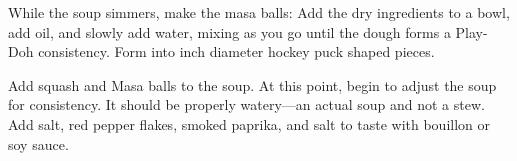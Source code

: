 \documentclass[12 pt, twoside]{amsart}
\begin{document}
{\begin{directions}
\item While the soup simmers, make the masa balls: Add the dry ingredients to a bowl, add oil, and slowly add water, mixing as you go until the dough forms a Play-Doh consistency. Form into inch diameter hockey puck shaped pieces. 
\item Add squash and Masa balls to the soup. At this point, begin to adjust the soup for consistency. It should be properly watery---an actual soup and not a stew. Add salt, red pepper flakes, smoked paprika, and salt to taste with bouillon or soy sauce.
\end{directions}
}
\end{document}
